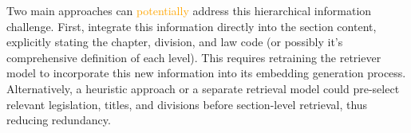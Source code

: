 

Two main approaches can \textcolor{orange}{potentially} address this hierarchical information challenge. First, integrate this information directly into the section content, explicitly stating the chapter, division, and law code (or possibly it's comprehensive definition of each level). This requires retraining the retriever model to incorporate this new information into its embedding generation process. Alternatively, a heuristic approach or a separate retrieval model could pre-select relevant legislation, titles, and divisions before section-level retrieval, thus reducing redundancy.

